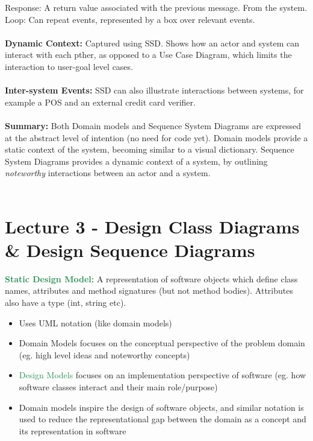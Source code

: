 \documentclass[a4paper,10pt]{article}
\begin{document}
\indent \textcolor{Emerald}{Response:} A return value associated with the previous message. From the system. \\
\indent \textcolor{Emerald}{Loop:} Can repeat events, represented by a box over relevant events. \\ \\
\textcolor{Emerald}{\textbf{Dynamic Context:}} Captured using SSD. Shows how an actor and system can interact with each pther, as opposed to a Use Case Diagram, which limits the interaction to user-goal level cases.\\\\
\textcolor{Emerald}{\textbf{Inter-system Events:}} SSD can also illustrate interactions between systems, for example a POS and an external credit card verifier. \\\\
\textcolor{Emerald}{\textbf{Summary:}} Both \textcolor{Emerald}{Domain models} and \textcolor{Emerald}{Sequence System Diagrams} are expressed at the abstract level of intention (no need for code yet). \textcolor{Emerald}{Domain models} provide a static context of the system, becoming similar to a visual dictionary. \textcolor{Emerald}{Sequence System Diagrams} provides a dynamic context of a system, by outlining \emph{noteworthy} interactions between an actor and a system.\\\\

\section*{Lecture 3 - Design Class Diagrams \& Design Sequence Diagrams}
\textcolor{SeaGreen}{\textbf{Static Design Model:}} A representation of software objects which define class names, attributes and method signatures (but not method bodies). Attributes also have a type (int, string etc). 
\renewcommand{\labelitemi}{\textperiodcentered}
\begin{itemize}
\item Uses UML notation (like domain models)
\item \textcolor{Emerald}{Domain Models} focuses on the conceptual perspective of the problem domain (eg. high level ideas and noteworthy concepts)
\item \textcolor{SeaGreen}{Design Models} focuses on an implementation perspective of software (eg. how software classes interact and their main role/purpose)
\item Domain models inspire the design of software objects, and similar notation is used to reduce the representational gap between the domain as a concept and its representation in software
\end{itemize}
\end{document}
